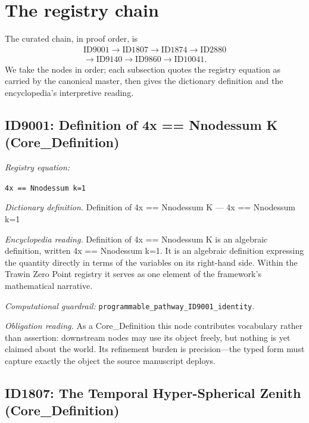 \documentclass[11pt]{article}
\theoremstyle{remark}
\begin{document}
\section{The registry chain}
\label{sec:chain}

The curated chain, in proof order, is
\begin{equation*}
\begin{gathered}
\text{ID9001} \to \text{ID1807} \to \text{ID1874} \to \text{ID2880} \\
\to \text{ID9140} \to \text{ID9860} \to \text{ID10041}.
\end{gathered}
\end{equation*}
We take the nodes in order; each subsection quotes the registry equation as carried by the canonical master, then gives the dictionary definition and the encyclopedia's interpretive reading.

\subsection{ID9001: Definition of 4x == Nnodessum K (Core\_Definition)}

\noindent\textit{Registry equation:}\par
{\small\texttt{4x == Nnodessum k=1}}\par\medskip
\noindent\textit{Dictionary definition.} Definition of 4x == Nnodessum K --- 4x == Nnodessum k=1\par\medskip
\noindent\textit{Encyclopedia reading.} Definition of 4x == Nnodessum K is an algebraic definition, written 4x == Nnodessum k=1. It is an algebraic definition expressing the quantity directly in terms of the variables on its right-hand side. Within the Trawin Zero Point registry it serves as one element of the framework's mathematical narrative.
\par\medskip\noindent\textit{Computational guardrail:} \texttt{programmable\_pathway\_ID9001\_identity}.
\par\medskip\noindent\textit{Obligation reading.} As a Core\_Definition this node contributes vocabulary rather than assertion: downstream nodes may use its object freely, but nothing is yet claimed about the world. Its refinement burden is precision---the typed form must capture exactly the object the source manuscript deploys.

\subsection{ID1807: The Temporal Hyper-Spherical Zenith (Core\_Definition)}
\end{document}
